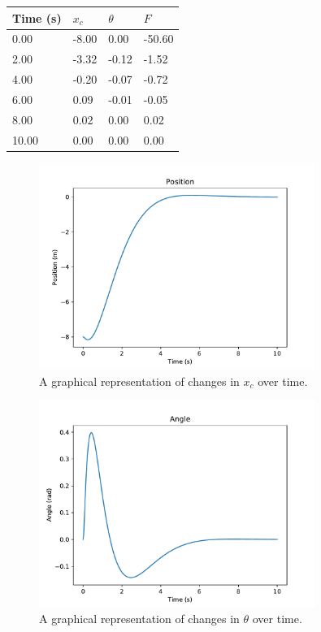 \documentclass[11pt]{article}
\begin{document}
\begin{center}
    \begin{tabular}{|l|l|l|l|}
        \hline
        Time (s) & $x _c$ & $\theta$ & $F$ \\
        \hline
        0.00 & -8.00 & 0.00 & -50.60 \\
        \hline
        2.00 & -3.32 & -0.12 & -1.52 \\
        \hline
        4.00 & -0.20 & -0.07 & -0.72 \\
        \hline
        6.00 & 0.09 & -0.01 & -0.05 \\
        \hline
        8.00 & 0.02 & 0.00 & 0.02 \\
        \hline
        10.00 & 0.00 & 0.00 & 0.00 \\
        \hline
    \end{tabular}
     \label{motion_statistics}
\end{center}

\begin{figure}[H]
    \centering
    \includegraphics[width=0.8\textwidth]{position}
    \caption{\label{position} A graphical representation of changes in $x _c$ over time.}
\end{figure}

\begin{figure}[H]
    \centering
    \includegraphics[width=0.8\textwidth]{angle}
    \caption{\label{angle} A graphical representation of changes in $\theta$ over time.}
\end{figure}
\end{document}
